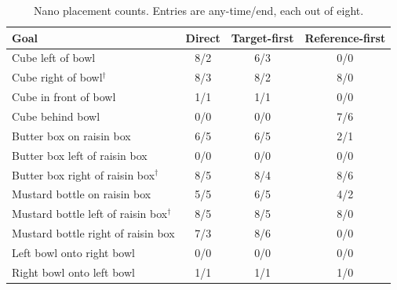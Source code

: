 \documentclass{article}
\begin{document}
\begin{table}[htbp]\centering\small
\caption{Nano placement counts. Entries are any-time/end, each out of eight.}
\begin{tabular}{@{}p{.48\linewidth}ccc@{}}\toprule Goal & Direct & Target-first & Reference-first\\\midrule

Cube left of bowl & 8/2 & 6/3 & 0/0\\

Cube right of bowl$^\dagger$ & 8/3 & 8/2 & 8/0\\

Cube in front of bowl & 1/1 & 1/1 & 0/0\\

Cube behind bowl & 0/0 & 0/0 & 7/6\\

Butter box on raisin box & 6/5 & 6/5 & 2/1\\

Butter box left of raisin box & 0/0 & 0/0 & 0/0\\

Butter box right of raisin box$^\dagger$ & 8/5 & 8/4 & 8/6\\

Mustard bottle on raisin box & 5/5 & 6/5 & 4/2\\

Mustard bottle left of raisin box$^\dagger$ & 8/5 & 8/5 & 8/0\\

Mustard bottle right of raisin box & 7/3 & 8/6 & 0/0\\

Left bowl onto right bowl & 0/0 & 0/0 & 0/0\\

Right bowl onto left bowl & 1/1 & 1/1 & 1/0\\

\bottomrule\end{tabular}\end{table}
\end{document}
